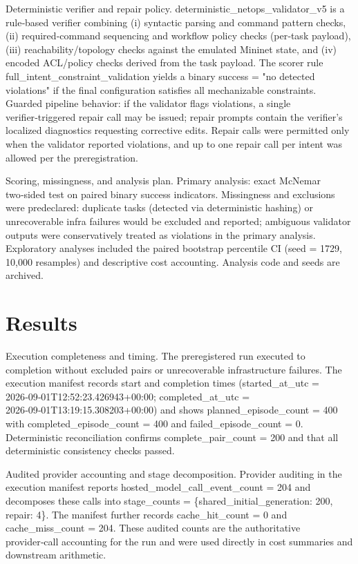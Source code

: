 \documentclass[conference]{IEEEtran}
\begin{document}
Deterministic verifier and repair policy. deterministic\_netops\_validator\_v5 is a rule‑based verifier combining (i) syntactic parsing and command pattern checks, (ii) required‑command sequencing and workflow policy checks (per‑task payload), (iii) reachability/topology checks against the emulated Mininet state, and (iv) encoded ACL/policy checks derived from the task payload. The scorer rule full\_intent\_constraint\_validation yields a binary success = "no detected violations" if the final configuration satisfies all mechanizable constraints. Guarded pipeline behavior: if the validator flags violations, a single verifier‑triggered repair call may be issued; repair prompts contain the verifier's localized diagnostics requesting corrective edits. Repair calls were permitted only when the validator reported violations, and up to one repair call per intent was allowed per the preregistration.

Scoring, missingness, and analysis plan. Primary analysis: exact McNemar two‑sided test on paired binary success indicators. Missingness and exclusions were predeclared: duplicate tasks (detected via deterministic hashing) or unrecoverable infra failures would be excluded and reported; ambiguous validator outputs were conservatively treated as violations in the primary analysis. Exploratory analyses included the paired bootstrap percentile CI (seed = 1729, 10,000 resamples) and descriptive cost accounting. Analysis code and seeds are archived.

\section{Results}
Execution completeness and timing. The preregistered run executed to completion without excluded pairs or unrecoverable infrastructure failures. The execution manifest records start and completion times (started\_at\_utc = 2026‑09‑01T12:52:23.426943+00:00; completed\_at\_utc = 2026‑09‑01T13:19:15.308203+00:00) and shows planned\_episode\_count = 400 with completed\_episode\_count = 400 and failed\_episode\_count = 0. Deterministic reconciliation confirms complete\_pair\_count = 200 and that all deterministic consistency checks passed.

Audited provider accounting and stage decomposition. Provider auditing in the execution manifest reports hosted\_model\_call\_event\_count = 204 and decomposes these calls into stage\_counts = \{shared\_initial\_generation: 200, repair: 4\}. The manifest further records cache\_hit\_count = 0 and cache\_miss\_count = 204. These audited counts are the authoritative provider‑call accounting for the run and were used directly in cost summaries and downstream arithmetic.
\end{document}
